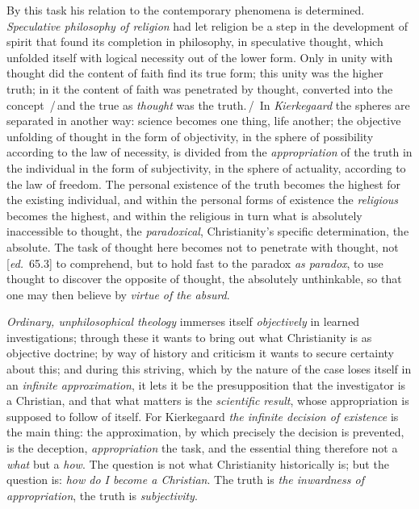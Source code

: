\documentclass[12pt,a4paper,openany]{book}
\newcommand{\kpage}[1]{\marginnote{\footnotesize\textit{[#1]}}}
\newcommand{\ed}[1]{{\small[\textit{ed.}\ #1]}}
\newcommand{\ins}[1]{\,/\,#1\,/\,}
\begin{document}
By this task his relation to the contemporary phenomena is
determined. \emph{Speculative philosophy of religion} had let religion
be a step in the development of spirit that found its completion in philosophy,
in speculative thought, which unfolded itself with logical necessity
out of the lower form. Only in unity with thought did the content of
faith find its true form; this unity was the higher truth;
in it the content of faith was penetrated by thought, converted into
the concept \ins{and the true as \emph{thought} was the truth.} In \emph{Kierkegaard}
the spheres are separated in another way: science becomes one thing, life
another; the objective unfolding of thought in the form of
objectivity, in the sphere of possibility according to the law of necessity, is divided from
the \emph{appropriation} of the truth in the individual in the form of subjectivity, in the sphere of actuality\kpage{98},
according to the law of freedom. The personal existence of the truth
becomes the highest for the existing individual, and within the personal
forms of existence the \emph{religious} becomes the highest, and within the
religious in turn what is absolutely inaccessible to thought, the \emph{paradoxical},
Christianity's specific determination, the absolute. The task of
thought here becomes not to penetrate with thought, not \ed{65.3} to
comprehend, but to hold fast to the paradox \emph{as paradox}, to use thought to
discover the opposite of thought, the absolutely unthinkable, so that one may
then believe by \emph{virtue of the absurd}.

\emph{Ordinary, unphilosophical theology} immerses itself \emph{objectively} in learned
investigations; through these it wants to bring out what Christianity
is as objective doctrine; by way of history and criticism it wants
to secure certainty about this; and during this striving, which by
the nature of the case loses itself in an \emph{infinite approximation}, it lets it be
the presupposition that the investigator is a Christian, and that what
matters is the \emph{scientific result}, whose appropriation is supposed to follow
of itself. For Kierkegaard \emph{the infinite decision of existence} is the main thing:
the approximation, by which precisely the decision is prevented,
is the deception, \emph{appropriation} the task, and the essential thing therefore
not a \emph{what} but a \emph{how}. The question is not what Christianity
historically is; but the question is: \emph{how do I become a Christian}.
The truth is \emph{the inwardness of appropriation}, the truth is \emph{subjectivity}.
\end{document}
